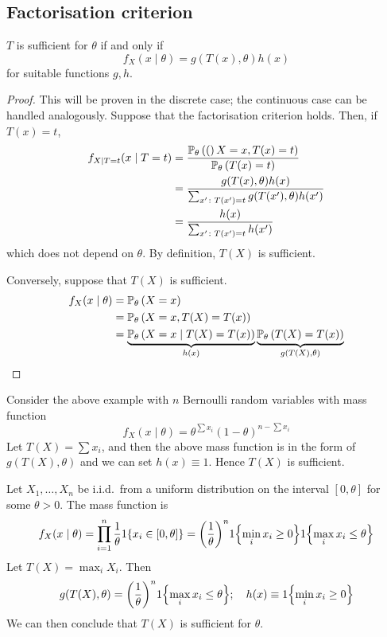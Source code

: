 \subsection{Factorisation criterion}
\begin{theorem}
	\( T \) is sufficient for \( \theta \) if and only if
	\[ f_X(x \mid \theta) = g(T(x), \theta) h(x) \]
	for suitable functions \( g,h \).
\end{theorem}
\begin{proof}
	This will be proven in the discrete case; the continuous case can be handled analogously.
	Suppose that the factorisation criterion holds.
	Then, if \( T(x) = t \),
	\begin{align*}
		f_{X \mid T = t}(x \mid T = t) &= \frac{\mathbb{P}_{\theta}\left({(}\right)X = x, T(x) = t)}{\mathbb{P}_{\theta}\left({T(x) = t}\right)} \\
		&= \frac{g(T(x),\theta)h(x)}{\sum_{x' \colon T(x') = t} g(T(x'),\theta)h(x')} \\
		&= \frac{h(x)}{\sum_{x' \colon T(x') = t} h(x')}
	\end{align*}
	which does not depend on \( \theta \).
	By definition, \( T(X) \) is sufficient.

	Conversely, suppose that \( T(X) \) is sufficient.
	\begin{align*}
		f_X(x \mid \theta) &= \mathbb{P}_{\theta}\left({X = x}\right) \\
		&= \mathbb{P}_{\theta}\left({X = x, T(X) = T(x)}\right) \\
		&= \underbrace{\mathbb{P}_{\theta}\left({X = x \mid T(X) = T(x)}\right)}_{h(x)} \underbrace{\mathbb{P}_{\theta}\left({T(X) = T(x)}\right)}_{g(T(X), \theta)}
	\end{align*}
\end{proof}
\begin{example}
	Consider the above example with \( n \) Bernoulli random variables with mass function
	\[ f_X(x \mid \theta) = \theta^{\sum x_i} (1-\theta)^{n - \sum x_i} \]
	Let \( T(X) = \sum x_i \), and then the above mass function is in the form of \( g(T(X), \theta) \) and we can set \( h(x) \equiv 1 \).
	Hence \( T(X) \) is sufficient.
\end{example}
\begin{example}
	Let \( X_1, \dots, X_n \) be i.i.d.\ from a uniform distribution on the interval \( [0,\theta] \) for some \( \theta > 0 \).
	The mass function is
	\[ f_X(x \mid \theta) = \prod_{i=1}^n \frac{1}{\theta} 1\qty{x_i \in [0,\theta]} = \qty(\frac{1}{\theta})^{n} 1\qty{\min_i x_i \geq 0} 1\qty{\max_i x_i \leq \theta} \]
	Let \( T(X) = \max_i X_i \).
	Then
	\[ g(T(X), \theta) = \qty(\frac{1}{\theta})^n 1\qty{\max_i x_i \leq \theta};\quad h(x) \equiv 1\qty{\min_i x_i \geq 0} \]
	We can then conclude that \( T(X) \) is sufficient for \( \theta \).
\end{example}

